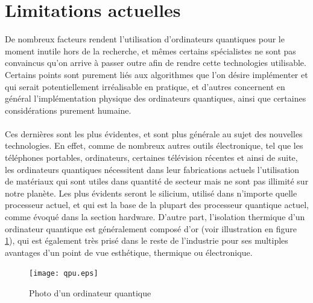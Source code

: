 \documentclass[11pt, a4paper]{report}
\begin{document}
\chapter*{Limitations actuelles}

De nombreux facteurs rendent l'utilisation d'ordinateurs quantiques pour le moment inutile hors de la recherche, et mêmes certains spécialistes ne sont pas convaincus qu'on arrive à passer outre afin de rendre cette technologies utilisable. Certains points sont purement liés aux algorithmes que l'on désire implémenter et qui serait potentiellement irréalisable en pratique, et d'autres concernent en général l'implémentation physique des ordinateurs quantiques, ainsi que certaines considérations purement humaine.\\ \\
Ces dernières sont les plus évidentes, et sont plus générale au sujet des nouvelles technologies. En effet, comme de nombreux autres outils électronique, tel que les téléphones portables, ordinateurs, certaines télévision récentes et ainsi de suite, les ordinateurs quantiques nécessitent dans leur fabrications actuels l'utilisation de matériaux qui sont utiles dans quantité de secteur mais ne sont pas illimité sur notre planète. Les plus évidents seront le silicium, utilisé dans n'importe quelle processeur actuel, et qui est la base de la plupart des processeur quantique actuel, comme évoqué dans la section hardware. D'autre part, l'isolation thermique d'un ordinateur quantique est généralement composé d'or (voir illustration en figure \ref{fig:photo-qc}), qui est également très prisé dans le reste de l'industrie pour ses multiples avantages d'un point de vue esthétique, thermique ou électronique.

\begin{figure}[H]
\centering
\texttt{[image: qpu.eps]}
\caption{Photo d'un ordinateur quantique}
\label{fig:photo-qc}
\end{figure}
\end{document}
